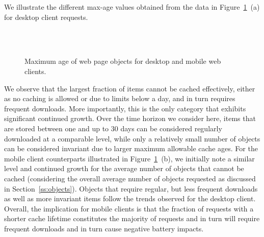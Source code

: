 \documentclass[onecolumn,12pt]{IEEEtran}
\begin{document}
We illustrate the different max-age values obtained from the data in Figure~\ref{fig:maxage}~(a) for desktop client requests.
\begin{figure}
	\centering
	\\
	\\
	\caption{Maximum age of web page objects for desktop and mobile web clients.\label{fig:maxage}}
\end{figure}
We observe that the largest fraction of items cannot be cached effectively, either as no caching is allowed or due to limits below a day, and in turn requires frequent downloads. 
More importantly, this is the only category that exhibits significant continued growth.
Over the time horizon we consider here, items that are stored between one and up to 30 days can be considered regularly downloaded at a comparable level, while only a relatively small number of objects can be considered invariant due to larger maximum allowable cache ages.
For the mobile client counterparts illustrated in Figure~\ref{fig:maxage}~(b), we initially note a similar level and continued growth for the average number of objects that cannot be cached (considering the overall average number of objects requested as discussed in Section~\ref{ss:objects}).
Objects that require regular, but less frequent downloads as well as more invariant items follow the trends observed for the desktop client.
Overall, the implication for mobile clients is that the fraction of requests with a shorter cache lifetime constitutes the majority of requests and in turn will require frequent downloads and in turn cause negative battery impacts.
\end{document}
